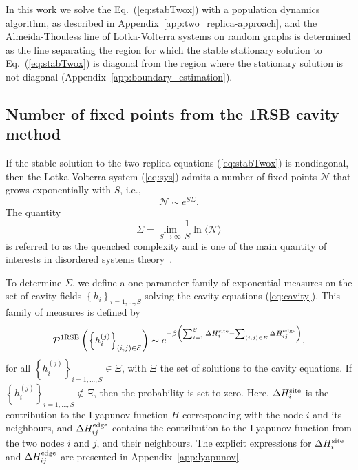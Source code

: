 \documentclass[11pt,a4paper]{article}
\begin{document}
In this work we solve the  Eq.~(\ref{eq:stabTwox})  with a population dynamics algorithm, as  described in Appendix~\ref{app:two_replica-approach}, and the  Almeida-Thouless line of Lotka-Volterra systems on random graphs is determined as the line separating the region for which the stable stationary  solution to Eq.~(\ref{eq:stabTwox})   is diagonal from the region where the stationary solution is not diagonal (Appendix~\ref{app:boundary_estimation}).  

\subsection{Number of fixed points from the 1RSB cavity method}
If the stable solution to the two-replica equations (\ref{eq:stabTwox}) is nondiagonal,  then the Lotka-Volterra system (\ref{eq:sys}) admits a number of fixed points $\mathcal{N}$ that grows exponentially with $S$, i.e., 
\begin{equation}
\mathcal{N} \sim e^{S\Sigma}.  
\end{equation}
The quantity 
\begin{equation}
\Sigma = \lim_{S\rightarrow \infty} \frac{1}{S}\ln\langle \mathcal{N} \rangle 
\end{equation}
is referred to as the quenched complexity and is one of the main quantity of interests in disordered systems theory~\cite{}.     

 To determine   $\Sigma$, we  define   a one-parameter family of  exponential measures on the set of cavity fields $\left\{h_i\right\}_{i=1,\ldots,S}$  solving the cavity equations (\ref{eq:cavity}).      This family of measures is defined by 
\begin{equation}
\mathcal{P}^{\rm 1RSB}\left(\left\{h^{(j)}_i\right\}_{(i,j)\in \mathcal{E}}\right) \sim  e^{-\beta \left(\sum^S_{i=1}\Delta H^{\rm site}_i - \sum_{(i,j)\in E}\Delta H^{\rm edge}_{ij}\right)}, \label{eq:P1RSB}  
\end{equation}
for all $\left\{h^{(j)}_i\right\}_{i=1,\ldots,S}\in \Xi$,  with $\Xi$ the set of solutions to the cavity equations.   If  $\left\{h^{(j)}_i\right\}_{i=1,\ldots,S}\notin \Xi$, then the probability is set to zero. 
Here, $\Delta H^{\rm site}_i$ is the  contribution to the Lyapunov function $H$ corresponding with the node $i$ and its neighbours, and $\Delta H^{\rm edge}_{ij}$ contains the contribution to the Lyapunov function from the  two  nodes $i$ and $j$, and their neighbours.     The explicit expressions for $\Delta H^{\rm site}_i$  and   $\Delta H^{\rm edge}_{ij}$  are presented in Appendix~\ref{app:lyapunov}.  
\end{document}
